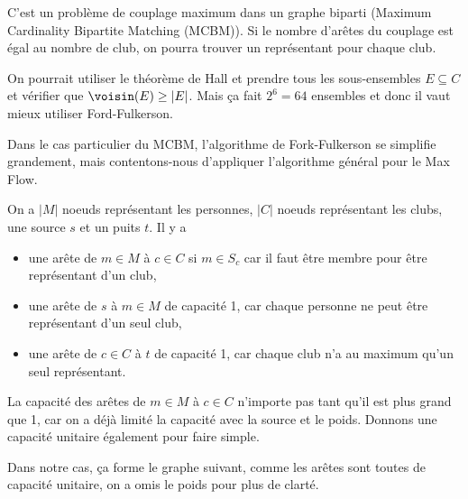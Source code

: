 \begin{solution}
  C'est un problème de couplage maximum dans un graphe biparti (Maximum Cardinality Bipartite Matching (MCBM)).
  Si le nombre d'arêtes du couplage est égal au nombre de club,
  on pourra trouver un représentant pour chaque club.

  On pourrait utiliser le théorème de Hall et prendre tous les sous-ensembles $E \subseteq C$
  et vérifier que $\voisin(E) \geq |E|$.
  Mais ça fait $2^6 = 64$ ensembles et donc il vaut mieux utiliser Ford-Fulkerson.

  Dans le cas particulier du MCBM,
  l'algorithme de Fork-Fulkerson se simplifie grandement, mais contentons-nous d'appliquer l'algorithme
  général pour le Max Flow.

  On a $|M|$ noeuds représentant les personnes,
  $|C|$ noeuds représentant les clubs, une source $s$ et un puits $t$.
  Il y a
  \begin{itemize}
    \item une arête de $m \in M$ à $c \in C$ si $m \in S_c$ car il faut être membre pour être représentant d'un club,
    \item une arête de $s$ à $m \in M$ de capacité 1, car chaque personne ne peut être représentant d'un seul club,
    \item une arête de $c \in C$ à $t$ de capacité 1, car chaque club n'a au maximum qu'un seul représentant.
  \end{itemize}
  La capacité des arêtes de $m \in M$ à $c \in C$ n'importe pas tant qu'il est plus grand que 1,
  car on a déjà limité la capacité avec la source et le poids.
  Donnons une capacité unitaire également pour faire simple.

  Dans notre cas, ça forme le graphe suivant,
  comme les arêtes sont toutes de capacité unitaire,
  on a omis le poids pour plus de clarté.
  \begin{center}
  \end{center}


\end{solution}
